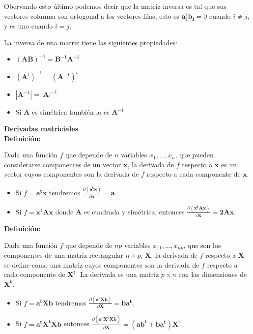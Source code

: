 \documentclass[12pt,letterpaper]{report} %
\begin{document}
Obervando esto último podemos decir que la matriz inversa es tal que sus vectores columna son ortogonal a los vectores filas, esto es $\mathbf{a_{i}^tb_{j}}=0$ cuando $i\ne j$, y es uno cuando $i=j$.

La inversa de una matriz tiene las siguientes propiedades:
\begin{itemize}
\item $(\mathbf{AB})^{-1}=\mathbf{B}^{-1}\mathbf{A}^{-1}$
\item $(\mathbf{A}^{t})^{-1}=(\mathbf{A}^{-1})^{t}$
\item $|\mathbf{A}^{-1}|=|\mathbf{A}|^{-1}$
\item Si $\mathbf{A}$ es simétrica también lo es $\mathbf{A}^{-1}$
\end{itemize}

\textbf{Derivadas matriciales} \\

\textbf{Definición:}

Dada una función $f$ que depende de $n$ variables $x_1,...,x_n$, que pueden considerarse componentes de un vector $\mathbf{x}$, la derivada de $f$ respecto a $\mathbf{x}$ es un vector cuyos componentes son la derivada de $f$ respecto a cada componente de $\mathbf{x}$.

\begin{itemize}
\item Si $f=\mathbf{a^tx}$ tendremos $\frac{\partial(\mathbf{a^tx})}{\partial \mathbf{x}}=\mathbf{a}$.
\item Si $f=\mathbf{x^tAx}$ donde $\mathbf{A}$ es cuadrada y simétrica, entonces $\frac{\partial(\mathbf{x^tAx})}{\partial \mathbf{x}}=\mathbf{2Ax}$.
\end{itemize}

\textbf{Definición:}

Dada una función $f$ que depende de $np$ variables $x_{11},...,x_{np}$, que son los componentes de una matriz rectangular $n\times p$, $\mathbf{X}$, la derivada de $f$ respecto a $\mathbf{X}$ se define como una matriz cuyos componentes son la derivada de $f$ respecto a cada componente de $\mathbf{X^t}$. La derivada es una matriz $p\times n$ con las dimensiones de $\mathbf{X^t}$.

\begin{itemize}
\item  Si $f=\mathbf{a^tXb}$ tendremos $\frac{\partial (\mathbf{a^tXb})}{\partial \mathbf{X}}=\mathbf{ba^t}$.
\item  Si $f=\mathbf{a^tX^tXb}$ entonces $\frac{\partial (\mathbf{a^tX^tXb})}{\partial \mathbf{X}}=(\mathbf{ab^t}+\mathbf{ba^t})\mathbf{X^t}$.
\end{itemize}
\end{document}
